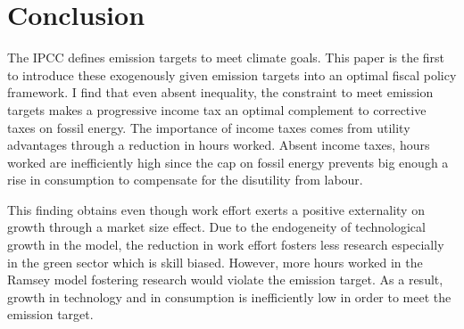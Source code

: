 \section{Conclusion}\label{sec:con}

\begin{comment}
	content...
\tr{In contrast to \cite{Acemoglu2012TheChange}, perceiving dirty output as the source of the externality is misleading in my model: As productivity in this sector rises, so does the externality. Instead, one could think of one input factor to dirty production (i.e. energy) which causes pollution, then a more productive technology can generate more output at a lower externality. \\
Substitutability as the focus of technological advancement: (a) the economy grows as more clean goods can be used to replace dirty goods; this corresponds to less emissions in the final good production. (b) or progress on dirtiness of energy use...CONSULT \cite{Acemoglu2012TheChange} who discuss distinct forms of progress. }

\end{comment}

The IPCC defines emission targets to meet climate goals. This paper is the first to introduce these exogenously given emission targets into an optimal fiscal policy framework. I find that even absent inequality, the constraint to meet emission targets makes a progressive income tax an optimal complement to corrective taxes on fossil energy. 
The importance of income taxes comes from utility advantages through a reduction in hours worked. Absent income taxes, hours worked are inefficiently high since the cap on fossil energy prevents big enough a rise in consumption to compensate for the disutility from labour. 

This finding obtains even though work effort exerts a positive externality on growth through a market size effect. 
Due to the endogeneity of technological growth in the model, the reduction in work effort fosters less research especially in the green sector which is skill biased.  However, more hours worked in the Ramsey model fostering research would violate the emission target. As a result, growth in technology and in consumption is inefficiently low in order to meet the emission target. 


